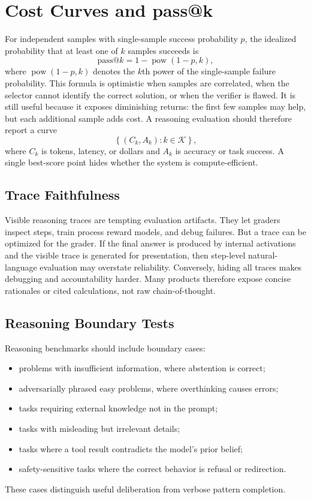 \section{Cost Curves and pass@k}
\label{sec:reasoning-cost-curves-passk}

For independent samples with single-sample success probability $p$, the idealized probability that at least one of $k$ samples succeeds is
\begin{equation}
  \mathrm{pass@}k = 1-\operatorname{pow}(1-p,k),
\end{equation}
where $\operatorname{pow}(1-p,k)$ denotes the $k$th power of the single-sample failure probability.
This formula is optimistic when samples are correlated, when the selector cannot identify the correct solution, or when the verifier is flawed. It is still useful because it exposes diminishing returns: the first few samples may help, but each additional sample adds cost. A reasoning evaluation should therefore report a curve
\begin{equation}
  \left\{(C_k, A_k): k\in\mathcal{K}\right\},
\end{equation}
where $C_k$ is tokens, latency, or dollars and $A_k$ is accuracy or task success. A single best-score point hides whether the system is compute-efficient.

\subsection{Trace Faithfulness}
Visible reasoning traces are tempting evaluation artifacts. They let graders inspect steps, train process reward models, and debug failures. But a trace can be optimized for the grader. If the final answer is produced by internal activations and the visible trace is generated for presentation, then step-level natural-language evaluation may overstate reliability. Conversely, hiding all traces makes debugging and accountability harder. Many products therefore expose concise rationales or cited calculations, not raw chain-of-thought.

\subsection{Reasoning Boundary Tests}
Reasoning benchmarks should include boundary cases:
\begin{itemize}
    \item problems with insufficient information, where abstention is correct;
    \item adversarially phrased easy problems, where overthinking causes errors;
    \item tasks requiring external knowledge not in the prompt;
    \item tasks with misleading but irrelevant details;
    \item tasks where a tool result contradicts the model's prior belief;
    \item safety-sensitive tasks where the correct behavior is refusal or redirection.
\end{itemize}
These cases distinguish useful deliberation from verbose pattern completion.

